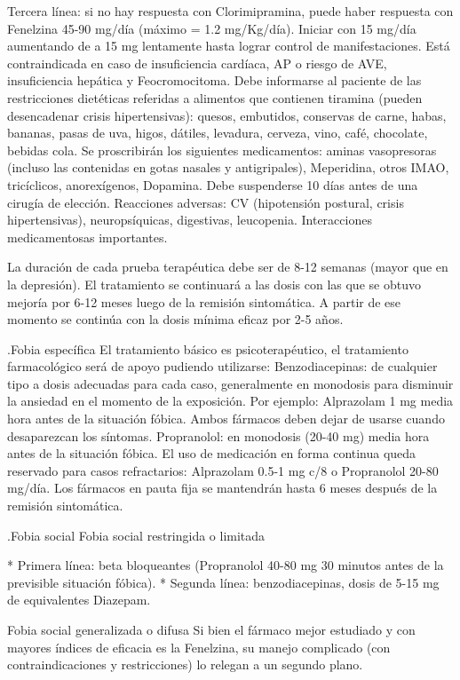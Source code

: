 \begin{itemize}
Tercera línea: si no hay respuesta con Clorimipramina, puede haber respuesta con Fenelzina 45-90 mg/día (máximo = 1.2 mg/Kg/día). Iniciar con 15 mg/día aumentando de a 15 mg lentamente hasta lograr control de manifestaciones. Está contraindicada en caso de insuficiencia cardíaca, AP o riesgo de AVE, insuficiencia hepática y Feocromocitoma. Debe informarse al paciente de las restricciones dietéticas referidas a alimentos que contienen tiramina (pueden desencadenar crisis hipertensivas): quesos, embutidos, conservas de carne, habas, bananas, pasas de uva, higos, dátiles, levadura, cerveza, vino, café, chocolate, bebidas cola. Se proscribirán los siguientes medicamentos: aminas vasopresoras (incluso las contenidas en gotas nasales y antigripales), Meperidina, otros IMAO, tricíclicos, anorexígenos, Dopamina. Debe suspenderse 10 días antes de una cirugía de elección. Reacciones adversas: CV (hipotensión postural, crisis hipertensivas), neuropsíquicas, digestivas, leucopenia. Interacciones medicamentosas importantes.

La duración de cada prueba terapéutica debe ser de 8-12 semanas (mayor que en la depresión). El tratamiento se continuará a las dosis con las que se obtuvo mejoría por 6-12 meses luego de la remisión sintomática. A partir de ese momento se continúa con la dosis mínima eficaz por 2-5 años.

.Fobia específica
El tratamiento básico es psicoterapéutico, el tratamiento farmacológico será de apoyo pudiendo utilizarse: Benzodiacepinas: de cualquier tipo a dosis adecuadas para cada caso, generalmente en monodosis para disminuir la ansiedad en el momento de la exposición. Por ejemplo: Alprazolam 1 mg media hora antes de la situación fóbica. Ambos fármacos deben dejar de usarse cuando desaparezcan los síntomas. Propranolol: en monodosis (20-40 mg) media hora antes de la situación fóbica. El uso de medicación en forma continua queda reservado para casos refractarios: Alprazolam 0.5-1 mg c/8 o Propranolol 20-80 mg/día. Los fármacos en pauta fija se mantendrán hasta 6 meses después de la remisión sintomática.

.Fobia social
Fobia social restringida o limitada

* Primera línea: beta bloqueantes (Propranolol 40-80 mg 30 minutos antes de la previsible situación fóbica).
* Segunda línea: benzodiacepinas, dosis de 5-15 mg de equivalentes Diazepam.

Fobia social generalizada o difusa Si bien el fármaco mejor estudiado y con mayores índices de eficacia es la Fenelzina, su manejo complicado (con contraindicaciones y restricciones) lo relegan a un segundo plano.


\end{itemize}
